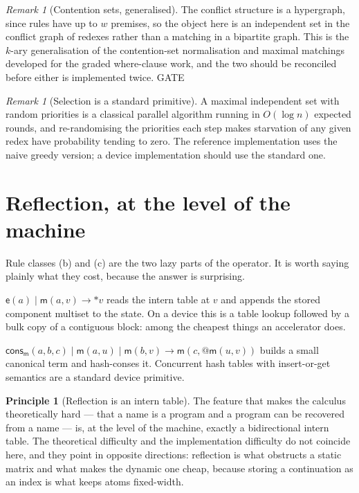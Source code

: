 \documentclass[11pt,a4paper]{article}
\makeatletter
\theoremstyle{plain}
\theoremstyle{definition}
\newtheorem{principle}[theorem]{Principle}
\theoremstyle{remark}
\newtheorem{remark}[theorem]{Remark}
\newcommand{\quo}[1]{@#1}
\newcommand{\drp}[1]{{*}#1}
\newcommand{\red}{\longrightarrow}
\newcommand{\mm}{\mathsf{m}}
\newcommand{\ev}{\mathsf{e}}
\newcommand{\consm}{\mathsf{cons}_{\mm}}
\makeatother
\begin{document}
\begin{remark}[Contention sets, generalised]
The conflict structure is a hypergraph, since rules have up to $w$ premises,
so the object here is an independent set in the conflict graph of redexes
rather than a matching in a bipartite graph. This is the $k$-ary
generalisation of the contention-set normalisation and maximal matchings
developed for the graded where-clause work, and the two should be reconciled
before either is implemented twice. \textsf{GATE}
\end{remark}

\begin{remark}[Selection is a standard primitive]
A maximal independent set with random priorities is a classical parallel
algorithm running in $O(\log n)$ expected rounds, and re-randomising the
priorities each step makes starvation of any given redex have probability
tending to zero. The reference implementation uses the naive greedy version;
a device implementation should use the standard one.
\end{remark}

\section{Reflection, at the level of the machine}
\label{sec:reflection}

Rule classes (b) and (c) are the two lazy parts of the operator. It is worth
saying plainly what they cost, because the answer is surprising.

\begin{description}[leftmargin=2.2em,style=nextline]
\item[Decode, the $\mathsf{eval}$ rule.] $\ev(a) \mid \mm(a,v) \red \drp{v}$
  reads the intern table at $v$ and appends the stored component multiset to
  the state. On a device this is a table lookup followed by a bulk copy of a
  contiguous block: among the cheapest things an accelerator does.
\item[Encode, the constructors.] $\consm(a,b,c) \mid \mm(a,u) \mid \mm(b,v)
  \red \mm(c,\quo{\mm(u,v)})$ builds a small canonical term and hash-conses
  it. Concurrent hash tables with insert-or-get semantics are a standard
  device primitive.
\end{description}

\begin{principle}[Reflection is an intern table]
\label{prin:reflection}
The feature that makes the calculus theoretically hard --- that a name is a
program and a program can be recovered from a name --- is, at the level of the
machine, exactly a bidirectional intern table. The theoretical difficulty and
the implementation difficulty do not coincide here, and they point in opposite
directions: reflection is what obstructs a static matrix and what makes the
dynamic one cheap, because storing a continuation as an index is what keeps
atoms fixed-width.
\end{principle}
\end{document}
